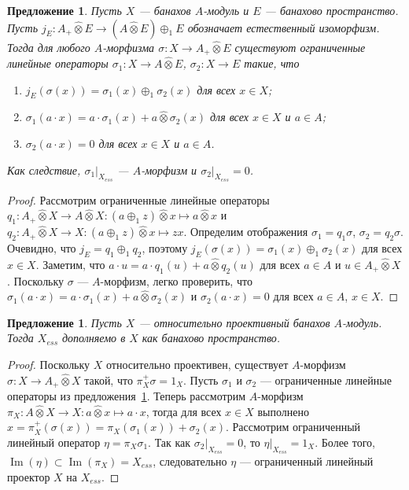 \documentclass[12pt]{article}
\newtheorem{proposition}[theorem]{Предложение}
\newcommand{\projtens}{\mathbin{\widehat{\otimes}}}
\begin{document}
\begin{proposition}\label{MorphDecomp} Пусть $X$ --- банахов $A$-модуль и $E$
    --- банахово пространство. Пусть $j_E:A_+\projtens E\to (A\projtens
        E)\oplus_1 E$ обозначает естественный изоморфизм. Тогда для любого
    $A$-морфизма $\sigma:X\to A_+\projtens E$ существуют ограниченные линейные
    операторы $\sigma_1:X\to A\projtens E$, $\sigma_2:X\to E$ такие, что
    \begin{enumerate}[label = (\roman*)]
        \item $j_E(\sigma(x))=\sigma_1(x)\oplus_1 \sigma_2(x)$ для всех $x\in
                  X$;

        \item $\sigma_1(a\cdot x)=a\cdot \sigma_1(x)+a\projtens \sigma_2(x)$ для
              всех $x\in X$ и $a\in A$;

        \item $\sigma_2(a\cdot x)=0$ для всех $x\in X$ и $a\in A$.

    \end{enumerate}
    \noindent
    Как следствие, $\sigma_1|_{X_{ess}}$ --- $A$-морфизм и
    $\sigma_2|_{X_{ess}}=0$.

\end{proposition}
\begin{proof} Рассмотрим ограниченные линейные операторы $q_1:A_+\projtens X\to
        A\projtens X: (a\oplus_1 z)\projtens x\mapsto a\projtens x$ и
    $q_2:A_+\projtens X\to X: (a\oplus_1 z)\projtens x\mapsto z x$.
    Определим отображения $\sigma_1=q_1\sigma$, $\sigma_2=q_2\sigma$.
    Очевидно, что $j_E=q_1\oplus_1 q_2$, поэтому
    $j_E(\sigma(x))=\sigma_1(x)\oplus_1 \sigma_2(x)$ для всех $x\in X$.
    Заметим, что $a\cdot u=a\cdot q_1(u)+a\projtens q_2(u)$ для всех $a\in
        A$ и $u\in A_+\projtens X$. Поскольку $\sigma$ --- $A$-морфизм, легко
    проверить, что $\sigma_1(a\cdot x)=a\cdot \sigma_1(x)+a\projtens
        \sigma_2(x)$ и $\sigma_2(a\cdot x)=0$ для всех $a\in A$, $x\in X$.
\end{proof}

\begin{proposition}\label{ProjModEssPartCompl} Пусть $X$ --- относительно
    проективный банахов $A$-модуль. Тогда $X_{ess}$ дополняемо в $X$ как
    банахово пространство.
\end{proposition}
\begin{proof} Поскольку $X$ относительно проективен, существует $A$-морфизм
    $\sigma:X\to A_+\projtens X$ такой, что $\pi_X^+\sigma=1_X$. Пусть
    $\sigma_1$ и $\sigma_2$ --- ограниченные линейные операторы из
    предложения~\ref{MorphDecomp}. Теперь рассмотрим $A$-морфизм
    $\pi_X:A\projtens X\to X:a\projtens x\mapsto a\cdot x$, тогда для всех $x\in
        X$ выполнено $x=\pi_X^+(\sigma(x))=\pi_X(\sigma_1(x)) + \sigma_2(x)$.
    Рассмотрим ограниченный линейный оператор $\eta = \pi_X\sigma_1$. Так как
    $\sigma_2|_{X_{ess}}=0$, то $\eta|_{X_{ess}}=1_X$. Более того,
    $\operatorname{Im}(\eta)\subset\operatorname{Im}(\pi_X)=X_{ess}$,
    следовательно $\eta$ --- ограниченный линейный проектор $X$ на $X_{ess}$.
\end{proof}
\end{document}
